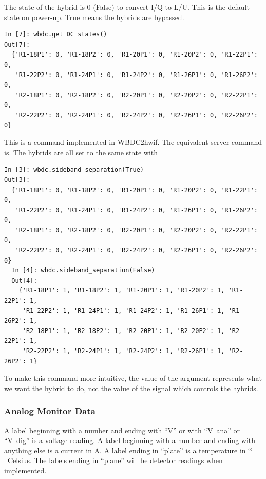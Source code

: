 \documentclass[letterpaper,11pt]{book}
\begin{document}
The state of the hybrid is 0 (False) to convert I/Q to L/U.  This is the
default state on power-up.  True means the hybrids are bypassed.
\begin{verbatim}
In [7]: wbdc.get_DC_states()
Out[7]:
  {'R1-18P1': 0, 'R1-18P2': 0, 'R1-20P1': 0, 'R1-20P2': 0, 'R1-22P1': 0,
   'R1-22P2': 0, 'R1-24P1': 0, 'R1-24P2': 0, 'R1-26P1': 0, 'R1-26P2': 0,
   'R2-18P1': 0, 'R2-18P2': 0, 'R2-20P1': 0, 'R2-20P2': 0, 'R2-22P1': 0,
   'R2-22P2': 0, 'R2-24P1': 0, 'R2-24P2': 0, 'R2-26P1': 0, 'R2-26P2': 0}
\end{verbatim}
This is a command implemented in {\ttfamily WBDC2hwif}.  The equivalent server
command is.  The hybrids are all set
to the same state with
\begin{verbatim}
In [3]: wbdc.sideband_separation(True)
Out[3]: 
  {'R1-18P1': 0, 'R1-18P2': 0, 'R1-20P1': 0, 'R1-20P2': 0, 'R1-22P1': 0,
   'R1-22P2': 0, 'R1-24P1': 0, 'R1-24P2': 0, 'R1-26P1': 0, 'R1-26P2': 0,
   'R2-18P1': 0, 'R2-18P2': 0, 'R2-20P1': 0, 'R2-20P2': 0, 'R2-22P1': 0,
   'R2-22P2': 0, 'R2-24P1': 0, 'R2-24P2': 0, 'R2-26P1': 0, 'R2-26P2': 0}
  In [4]: wbdc.sideband_separation(False)
  Out[4]: 
    {'R1-18P1': 1, 'R1-18P2': 1, 'R1-20P1': 1, 'R1-20P2': 1, 'R1-22P1': 1,
     'R1-22P2': 1, 'R1-24P1': 1, 'R1-24P2': 1, 'R1-26P1': 1, 'R1-26P2': 1,
     'R2-18P1': 1, 'R2-18P2': 1, 'R2-20P1': 1, 'R2-20P2': 1, 'R2-22P1': 1,
     'R2-22P2': 1, 'R2-24P1': 1, 'R2-24P2': 1, 'R2-26P1': 1, 'R2-26P2': 1}\end{verbatim}
\noindent To make this command more intuitive, the value of the argument
represents what we want the hybrid to do, not the value of the signal which
controls the hybrids.

\subsubsection{Analog Monitor Data}

A label beginning with a number and ending with ``V'' or with ``V~ana'' or
``V~dig'' is a voltage reading.
A label beginning with a number and ending with anything else is a current
in A. A label ending in ``plate'' is a temperature in $^{\odot}$~Celsius.
The labels ending in ``plane'' will be detector readings when implemented.
\end{document}

